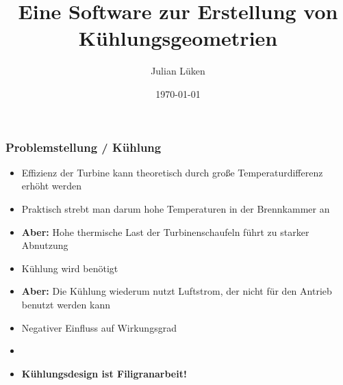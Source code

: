 \documentclass[8pt, aspectratio=169]{beamer}
\title[CoolingGen]{Eine Software zur Erstellung von Kühlungsgeometrien}
\author{Julian Lüken}
\date{\today}
\begin{document}
\begin{frame}[plain]
	\maketitle
\end{frame}

\begin{frame}
	\frametitle{Problemstellung / Kühlung}
	\vspace{-1cm}\hspace{-0.5cm}
	\centering
	\begin{minipage}[t]{0.8\textwidth}
		\centering
		\hspace{0.36\textwidth}
		
	\end{minipage}
	\begin{minipage}[t]{\textwidth}
		\begin{itemize}
			\item Effizienz der Turbine kann theoretisch durch große Temperaturdifferenz erhöht werden
			\item[] 	\textrightarrow{} Praktisch strebt man darum hohe Temperaturen in der Brennkammer an
			\item 		\textbf{Aber:} Hohe thermische Last der Turbinenschaufeln führt zu starker Abnutzung
			\item[] 	\textrightarrow{} Kühlung wird benötigt
			\item 		\textbf{Aber:} Die Kühlung wiederum nutzt Luftstrom, der nicht für den Antrieb benutzt werden kann
			\item[] 	\textrightarrow{} Negativer Einfluss auf Wirkungsgrad
			\item[] 	{}
			\item[\textrightarrow] \textbf{Kühlungsdesign ist Filigranarbeit!}
		\end{itemize}
	\end{minipage}
	\vfill
\end{frame}
\end{document}
